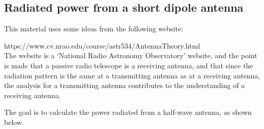 \documentclass[12pt]{article}
\begin{document}
\begin{flushleft}

\subsection*{Radiated power from a short dipole antenna} 

This material uses some ideas from the following website:

https://www.cv.nrao.edu/course/astr534/AntennaTheory.html  \\

\vspace{.1in}
The website is a `National Radio Astronomy Observatory' website, and the point is made that a passive radio telescope is a receiving antenna, and that since the radiation pattern is the same at a transmitting antenna as at a receiving antenna, the analysis for a transmitting antenna contributes to the understanding of a receiving antenna.

\vspace{.2in}
The goal is to calculate the power radiated from a half-wave antenna, as shown below.


\end{flushleft}
\end{document}
